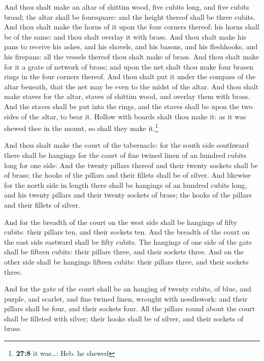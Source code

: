  And thou shalt make an altar of shittim wood, five cubits
long, and five cubits broad; the altar shall be foursquare: and the
height thereof shall be three cubits.  And thou shalt make
the horns of it upon the four corners thereof: his horns shall be of the
same: and thou shalt overlay it with brass.  And thou
shalt make his pans to receive his ashes, and his shovels, and his
basons, and his fleshhooks, and his firepans: all the vessels thereof
thou shalt make of brass.  And thou shalt make for it a
grate of network of brass; and upon the net shalt thou make four brasen
rings in the four corners thereof.  And thou shalt put it
under the compass of the altar beneath, that the net may be even to the
midst of the altar.  And thou shalt make staves for the
altar, staves of shittim wood, and overlay them with brass.
 And the staves shall be put into the rings, and the
staves shall be upon the two sides of the altar, to bear it.
 Hollow with boards shalt thou make it: as it was shewed
thee in the mount, so shall they make it.\footnote{\textbf{27:8} it
  was\ldots: Heb. he shewed}

 And thou shalt make the court of the tabernacle: for the
south side southward there shall be hangings for the court of fine
twined linen of an hundred cubits long for one side:  And
the twenty pillars thereof and their twenty sockets shall be of brass;
the hooks of the pillars and their fillets shall be of silver.
 And likewise for the north side in length there shall be
hangings of an hundred cubits long, and his twenty pillars and their
twenty sockets of brass; the hooks of the pillars and their fillets of
silver.

 And for the breadth of the court on the west side shall
be hangings of fifty cubits: their pillars ten, and their sockets ten.
 And the breadth of the court on the east side eastward
shall be fifty cubits.  The hangings of one side of the
gate shall be fifteen cubits: their pillars three, and their sockets
three.  And on the other side shall be hangings fifteen
cubits: their pillars three, and their sockets three.

 And for the gate of the court shall be an hanging of
twenty cubits, of blue, and purple, and scarlet, and fine twined linen,
wrought with needlework: and their pillars shall be four, and their
sockets four.  All the pillars round about the court
shall be filleted with silver; their hooks shall be of silver, and their
sockets of brass.

